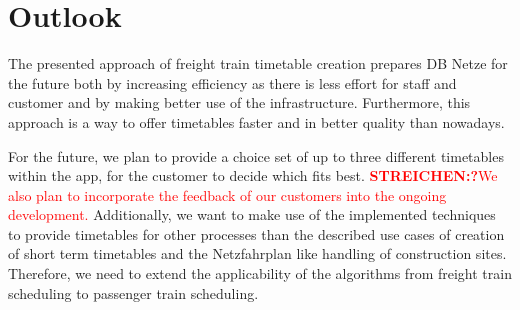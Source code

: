 \section{Outlook}
\label{chap:outlook}
The presented approach of freight train timetable creation prepares DB Netze for the future both by increasing efficiency as there is less effort for staff and customer and by making better use of the infrastructure. Furthermore, this approach is a way to offer timetables faster and in better quality than nowadays.

For the future, we plan to provide a choice set of up to three different timetables within the app, for the customer to decide which fits best. \textcolor{red}{\textbf{STREICHEN:?}We also plan to incorporate the feedback of our customers into the ongoing development.}
Additionally, we want to make use of the implemented techniques to provide timetables for other processes than the described use cases of creation of short term timetables and the Netzfahrplan like handling of construction sites. Therefore, we need to extend the applicability of the algorithms from freight train scheduling to passenger train scheduling.